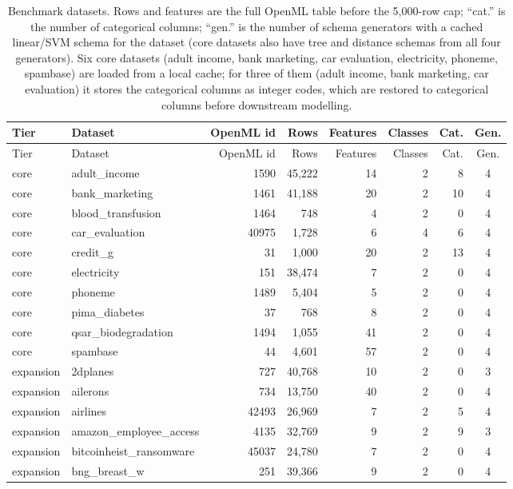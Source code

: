 \begin{longtable}{llrrrrrc}
\caption{Benchmark datasets. Rows and features are the full OpenML table before the 5{,}000-row cap; ``cat.'' is the number of categorical columns; ``gen.'' is the number of schema generators with a cached linear/SVM schema for the dataset (core datasets also have tree and distance schemas from all four generators). Six core datasets (adult income, bank marketing, car evaluation, electricity, phoneme, spambase) are loaded from a local cache; for three of them (adult income, bank marketing, car evaluation) it stores the categorical columns as integer codes, which are restored to categorical columns before downstream modelling.}\label{tab:datasets}\\
\toprule
Tier & Dataset & OpenML id & Rows & Features & Classes & Cat. & Gen. \\
\midrule
\endfirsthead
\toprule
Tier & Dataset & OpenML id & Rows & Features & Classes & Cat. & Gen. \\
\midrule
\endhead
\bottomrule
\endfoot
core & adult\_income & 1590 & 45{,}222 & 14 & 2 & 8 & 4 \\
core & bank\_marketing & 1461 & 41{,}188 & 20 & 2 & 10 & 4 \\
core & blood\_transfusion & 1464 & 748 & 4 & 2 & 0 & 4 \\
core & car\_evaluation & 40975 & 1{,}728 & 6 & 4 & 6 & 4 \\
core & credit\_g & 31 & 1{,}000 & 20 & 2 & 13 & 4 \\
core & electricity & 151 & 38{,}474 & 7 & 2 & 0 & 4 \\
core & phoneme & 1489 & 5{,}404 & 5 & 2 & 0 & 4 \\
core & pima\_diabetes & 37 & 768 & 8 & 2 & 0 & 4 \\
core & qsar\_biodegradation & 1494 & 1{,}055 & 41 & 2 & 0 & 4 \\
core & spambase & 44 & 4{,}601 & 57 & 2 & 0 & 4 \\
expansion & 2dplanes & 727 & 40{,}768 & 10 & 2 & 0 & 3 \\
expansion & ailerons & 734 & 13{,}750 & 40 & 2 & 0 & 4 \\
expansion & airlines & 42493 & 26{,}969 & 7 & 2 & 5 & 4 \\
expansion & amazon\_employee\_access & 4135 & 32{,}769 & 9 & 2 & 9 & 3 \\
expansion & bitcoinheist\_ransomware & 45037 & 24{,}780 & 7 & 2 & 0 & 4 \\
expansion & bng\_breast\_w & 251 & 39{,}366 & 9 & 2 & 0 & 4 \\

\end{longtable}
